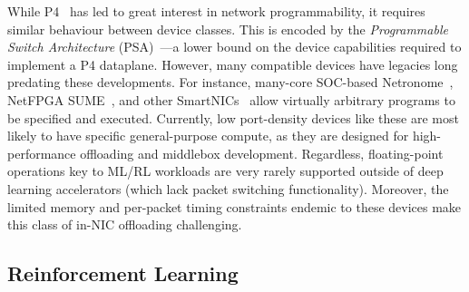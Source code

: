 \documentclass[
sigconf,natbib=false
,anonymous=true
,10pt
]{acmart}
\newcounter{insightc}
\newenvironment{insight}
	{
		\begin{tipblock}\refstepcounter{insightc}\textbf{Insight \theinsightc:}\em
	}
	{
		\end{tipblock}
	}
\begin{document}
While P4~\parencite{DBLP:journals/ccr/BosshartDGIMRSTVVW14} has led to great interest in network programmability, it requires similar behaviour between device classes.
This is encoded by the \emph{Programmable Switch Architecture} (PSA)~\parencite{p4-psa}---a lower bound on the device capabilities required to implement a P4 dataplane.
However, many compatible devices have legacies long predating these developments. 
For instance, many-core SOC-based Netronome~\parencite{netronome-smartnic}, NetFPGA SUME~\parencite{DBLP:journals/micro/ZilbermanACM14,DBLP:conf/fpga/IbanezBMZ19}, and other SmartNICs~\parencite{nvidia-bluefield,xilinx-alveo} allow virtually arbitrary programs to be specified and executed.
Currently, low port-density devices like these are most likely to have specific general-purpose compute, as they are designed for high-performance offloading and middlebox development.
Regardless, floating-point operations key to ML/RL workloads are very rarely supported outside of deep learning accelerators (which lack packet switching functionality).
Moreover, the limited memory and per-packet timing constraints endemic to these devices make this class of in-NIC offloading challenging.


\subsection{Reinforcement Learning}
%
\end{document}
